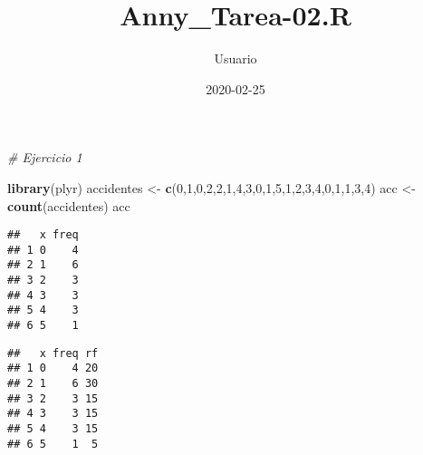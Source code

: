 \documentclass[
]{article}
\title{Anny\_Tarea-02.R}
\author{Usuario}
\date{2020-02-25}
\newenvironment{Shaded}{\begin{snugshade}}{\end{snugshade}}
\newcommand{\CommentTok}[1]{\textcolor[rgb]{0.56,0.35,0.01}{\textit{#1}}}
\newcommand{\DataTypeTok}[1]{\textcolor[rgb]{0.13,0.29,0.53}{#1}}
\newcommand{\DecValTok}[1]{\textcolor[rgb]{0.00,0.00,0.81}{#1}}
\newcommand{\KeywordTok}[1]{\textcolor[rgb]{0.13,0.29,0.53}{\textbf{#1}}}
\newcommand{\NormalTok}[1]{#1}
\newcommand{\OperatorTok}[1]{\textcolor[rgb]{0.81,0.36,0.00}{\textbf{#1}}}
\newcommand{\StringTok}[1]{\textcolor[rgb]{0.31,0.60,0.02}{#1}}
\begin{document}
\maketitle

\begin{Shaded}
\begin{Highlighting}[]
\CommentTok{# Ejercicio 1}

\KeywordTok{library}\NormalTok{(plyr) }
\NormalTok{accidentes <-}\StringTok{ }\KeywordTok{c}\NormalTok{(}\DecValTok{0}\NormalTok{,}\DecValTok{1}\NormalTok{,}\DecValTok{0}\NormalTok{,}\DecValTok{2}\NormalTok{,}\DecValTok{2}\NormalTok{,}\DecValTok{1}\NormalTok{,}\DecValTok{4}\NormalTok{,}\DecValTok{3}\NormalTok{,}\DecValTok{0}\NormalTok{,}\DecValTok{1}\NormalTok{,}\DecValTok{5}\NormalTok{,}\DecValTok{1}\NormalTok{,}\DecValTok{2}\NormalTok{,}\DecValTok{3}\NormalTok{,}\DecValTok{4}\NormalTok{,}\DecValTok{0}\NormalTok{,}\DecValTok{1}\NormalTok{,}\DecValTok{1}\NormalTok{,}\DecValTok{3}\NormalTok{,}\DecValTok{4}\NormalTok{) }
\NormalTok{acc <-}\StringTok{ }\KeywordTok{count}\NormalTok{(accidentes) }
\NormalTok{acc }
\end{Highlighting}
\end{Shaded}

\begin{verbatim}
##   x freq
## 1 0    4
## 2 1    6
## 3 2    3
## 4 3    3
## 5 4    3
## 6 5    1
\end{verbatim}

\begin{Shaded}
\end{Shaded}

\begin{verbatim}
##   x freq rf
## 1 0    4 20
## 2 1    6 30
## 3 2    3 15
## 4 3    3 15
## 5 4    3 15
## 6 5    1  5
\end{verbatim}

\begin{Shaded}
\end{Shaded}
\end{document}
